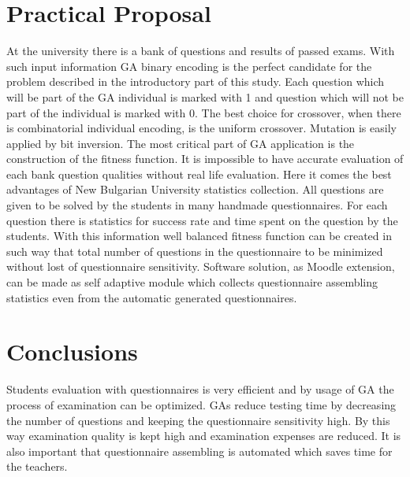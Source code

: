 \documentclass{llncs}
\begin{document}
\section{Practical Proposal}

At the university there is a bank of questions and results of passed exams. With such input information GA binary encoding is the perfect candidate for the problem described in the introductory part of this study. Each question which will be part of the GA individual is marked with 1 and question which will not be part of the individual is marked with 0. The best choice for crossover, when there is combinatorial individual encoding, is the uniform crossover. Mutation is easily applied by bit inversion. The most critical part of GA application is the construction of the fitness function. It is impossible to have accurate evaluation of each bank question qualities without real life evaluation. Here it comes the best advantages of New Bulgarian University statistics collection. All questions are given to be solved by the students in many handmade questionnaires. For each question there is statistics for success rate and time spent on the question by the students. With this information well balanced fitness function can be created in such way that total number of questions in the questionnaire to be minimized without lost of questionnaire sensitivity. Software solution, as Moodle extension, can be made as self adaptive module which collects questionnaire assembling statistics even from the automatic generated questionnaires.

\section{Conclusions}

Students evaluation with questionnaires is very efficient and by usage of GA the process of examination can be optimized. GAs reduce testing time by decreasing the number of questions and keeping the questionnaire sensitivity high. By this way examination quality is kept high and examination expenses are reduced. It is also important that questionnaire assembling is automated which saves time for the teachers. 

\end{document}
